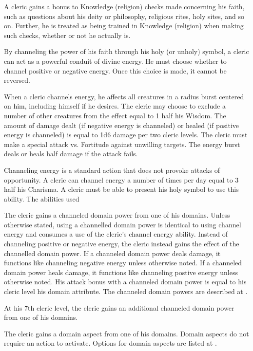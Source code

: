  A cleric gains a  bonus to Knowledge (religion) checks made concerning his faith, such as questions about his deity or philosophy, religious rites, holy sites, and so on. Further, he is treated as being trained in Knowledge (religion) when making such checks, whether or not he actually is.

 By channeling the power of his faith through his holy (or unholy) symbol, a cleric can act as a powerful conduit of divine energy. He must choose whether to channel positive or negative energy. Once this choice is made, it cannot be reversed.

When a cleric channels energy, he affects all creatures in a \areamed radius burst centered on him, including himself if he desires. The cleric may choose to exclude a number of other creatures from the effect equal to 1 \add half his Wisdom. The amount of damage dealt (if negative energy is channeled) or healed (if positive energy is channeled) is equal to 1d6 damage per two cleric levels. The cleric must make a special attack vs. Fortitude against unwilling targets. The energy burst deals or heals half damage if the attack fails.

Channeling energy is a standard action that does not provoke attacks of opportunity. A cleric can channel energy a number of times per day equal to 3 \add half his Charisma. A cleric must be able to present his holy symbol to use this ability. The abilities used 

 The cleric gains a channeled domain power from one of his domains. Unless otherwise stated, using a channelled domain power is identical to using channel energy and consumes a use of the cleric's channel energy ability. Instead of channeling positive or negative energy, the cleric instead gains the effect of the channelled domain power. If a channeled domain power deals damage, it functions like channeling negative energy unless otherwise noted. If a channeled domain power heals damage, it functions like channeling postive energy unless otherwise noted. His attack bonus with a channeled domain power is equal to his cleric level \add his domain attribute. The channeled domain powers are described at .

At his 7th cleric level, the cleric gains an additional channeled domain power from one of his domains.

 The cleric gains a domain aspect from one of his domains. Domain aspects do not require an action to activate. Options for domain aspects are listed at .

